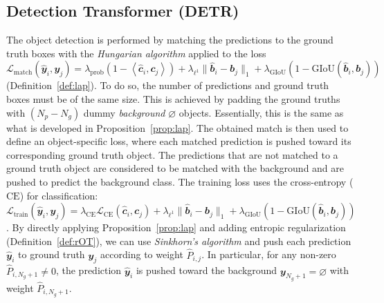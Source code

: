 \subsection{Detection Transformer (DETR)} The object detection is performed by matching the predictions to the ground truth boxes with the \emph{Hungarian algorithm} applied to the loss $\mathcal{L}_{\text{match}}(\hat{\mathbfit{y}}_i, \mathbfit{y}_j) = \lambda_{\text{prob}}(1 - \left< \hat{\mathbfit{c}}_i, \mathbfit{c}_j \right>) + \lambda_{\ell^1} \lVert\hat{\mathbfit{b}}_i- \mathbfit{b}_j\rVert_1 +\lambda_{\mathrm{GIoU}}(1-\mathrm{GIoU}(\hat{\mathbfit{b}}_i, \mathbfit{b}_j))$ (Definition~\ref{def:lap}). To do so, the number of predictions and ground truth boxes must be of the same size. This is achieved by padding the ground truths with $(N_p - N_g)$ dummy \emph{background} $\varnothing$ objects. Essentially, this is the same as what is developed in Proposition~\ref{prop:lap}. The obtained match is then used to define an object-specific loss, where each matched prediction is pushed toward its corresponding ground truth object. The predictions that are not matched to a ground truth object are considered to be matched with the background and are pushed to predict the background class. The training loss uses the cross-entropy ($\mathrm{CE}$) for classification: $\mathcal{L}_{\text{train}}(\hat{\mathbfit{y}}_i, \mathbfit{y}_j) = \lambda_{\mathrm{CE}} \mathcal{L}_{\mathrm{CE}}(\hat{\mathbfit{c}}_i, \mathbfit{c}_j) + \lambda_{\ell^1} \lVert\hat{\mathbfit{b}}_i- \mathbfit{b}_j\rVert_1 +\lambda_{\mathrm{GIoU}}(1-\mathrm{GIoU}(\hat{\mathbfit{b}}_i, \mathbfit{b}_j))$. By directly applying Proposition~\ref{prop:lap} and adding entropic regularization (Definition~\ref{def:rOT}), we can use \emph{Sinkhorn's algorithm} and push each prediction $\hat{\mathbfit{y}}_i$ to ground truth $\mathbfit{y}_j$ according to weight $\hat{P}_{i,j}$. In particular, for any non-zero $\hat{P}_{i,N_g+1} \neq 0$, the prediction $\hat{\mathbfit{y}}_i$ is pushed toward the background $\mathbfit{y}_{N_g+1} = \varnothing$ with weight $\hat{P}_{i,N_g+1}$.

